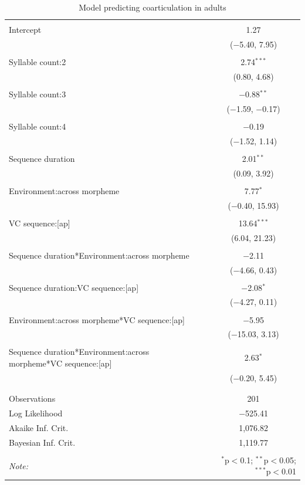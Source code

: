\documentclass[
]{article}
\begin{document}
\begin{table}[!htbp] \centering 
  \caption{Model predicting coarticulation in adults} 
  \label{} 
\begin{tabular}{@{\extracolsep{5pt}}lc} 
\\[-1.8ex]\hline 
\hline \\[-1.8ex] 
 Intercept & 1.27 \\ 
  & ($-$5.40, 7.95) \\ 
  & \\ 
 Syllable count:2 & 2.74$^{***}$ \\ 
  & (0.80, 4.68) \\ 
  & \\ 
 Syllable count:3 & $-$0.88$^{**}$ \\ 
  & ($-$1.59, $-$0.17) \\ 
  & \\ 
 Syllable count:4 & $-$0.19 \\ 
  & ($-$1.52, 1.14) \\ 
  & \\ 
 Sequence duration & 2.01$^{**}$ \\ 
  & (0.09, 3.92) \\ 
  & \\ 
 Environment:across morpheme & 7.77$^{*}$ \\ 
  & ($-$0.40, 15.93) \\ 
  & \\ 
 VC sequence:[ap] & 13.64$^{***}$ \\ 
  & (6.04, 21.23) \\ 
  & \\ 
 Sequence duration*Environment:across morpheme & $-$2.11 \\ 
  & ($-$4.66, 0.43) \\ 
  & \\ 
 Sequence duration:VC sequence:[ap] & $-$2.08$^{*}$ \\ 
  & ($-$4.27, 0.11) \\ 
  & \\ 
 Environment:across morpheme*VC sequence:[ap] & $-$5.95 \\ 
  & ($-$15.03, 3.13) \\ 
  & \\ 
 Sequence duration*Environment:across morpheme*VC sequence:[ap] & 2.63$^{*}$ \\ 
  & ($-$0.20, 5.45) \\ 
  & \\ 
\hline \\[-1.8ex] 
Observations & 201 \\ 
Log Likelihood & $-$525.41 \\ 
Akaike Inf. Crit. & 1,076.82 \\ 
Bayesian Inf. Crit. & 1,119.77 \\ 
\hline 
\hline \\[-1.8ex] 
\textit{Note:}  & \multicolumn{1}{r}{$^{*}$p$<$0.1; $^{**}$p$<$0.05; $^{***}$p$<$0.01} \\ 
\end{tabular} 
\end{table}
\end{document}
